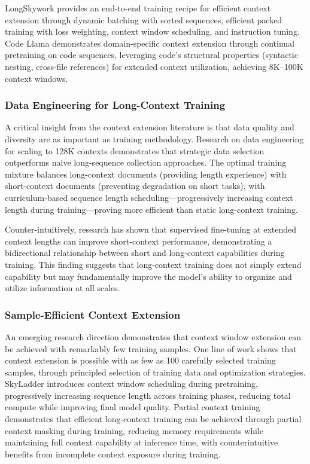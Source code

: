 \documentclass[11pt,letterpaper]{article}
\begin{document}
LongSkywork provides an end-to-end training recipe for efficient context extension through dynamic batching with sorted sequences, efficient packed training with loss weighting, context window scheduling, and instruction tuning. Code Llama demonstrates domain-specific context extension through continual pretraining on code sequences, leveraging code's structural properties (syntactic nesting, cross-file references) for extended context utilization, achieving 8K--100K context windows.

\subsubsection{Data Engineering for Long-Context Training}

A critical insight from the context extension literature is that data quality and diversity are as important as training methodology. Research on data engineering for scaling to 128K contexts demonstrates that strategic data selection outperforms naive long-sequence collection approaches. The optimal training mixture balances long-context documents (providing length experience) with short-context documents (preventing degradation on short tasks), with curriculum-based sequence length scheduling---progressively increasing context length during training---proving more efficient than static long-context training.

Counter-intuitively, research has shown that supervised fine-tuning at extended context lengths can improve short-context performance, demonstrating a bidirectional relationship between short and long-context capabilities during training. This finding suggests that long-context training does not simply extend capability but may fundamentally improve the model's ability to organize and utilize information at all scales.

\subsubsection{Sample-Efficient Context Extension}

An emerging research direction demonstrates that context window extension can be achieved with remarkably few training samples. One line of work shows that context extension is possible with as few as 100 carefully selected training samples, through principled selection of training data and optimization strategies. SkyLadder introduces context window scheduling during pretraining, progressively increasing sequence length across training phases, reducing total compute while improving final model quality. Partial context training demonstrates that efficient long-context training can be achieved through partial context masking during training, reducing memory requirements while maintaining full context capability at inference time, with counterintuitive benefits from incomplete context exposure during training.
\end{document}
